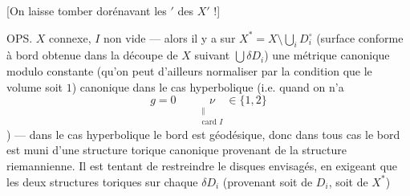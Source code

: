 [On laisse tomber dorénavant les $'$ des $X'$ !]


OPS. $X$ connexe, $I$ non vide --- alors
il y a sur $X^*=X\setminus\bigcup_i D_i^\circ$ (surface
conforme à bord obtenue dans la
découpe de $X$ suivant $\bigcup\delta D_i$) une
 métrique  canonique modulo
constante (qu'on peut d'ailleurs normaliser
par la condition que le volume soit $1$)
 canonique  dans le cas
hyperbolique (i.e. quand on n'a
\[
g=0\qquad \underset{\substack{\Vert\\\text{card }I}}{\nu}\in\{1,2\}
\]
) --- dans le cas
hyperbolique le bord est géodésique,
donc dans tous cas le bord est muni
d'une structure torique canonique
provenant de la structure riemannienne.
Il est tentant de restreindre le 
disques envisagés, en exigeant que
les deux structures toriques sur
chaque $\delta D_i$ (provenant soit de $D_i$, soit de $X^*$)
